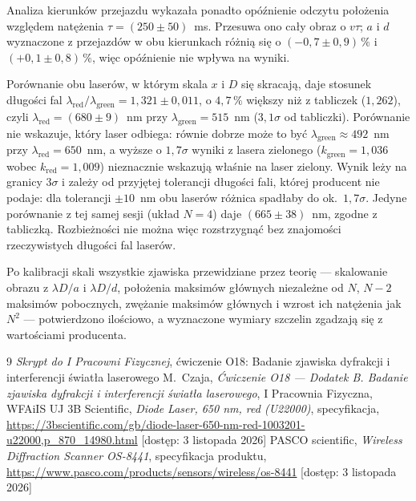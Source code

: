 \documentclass[12pt, a4paper]{article}
\begin{document}
Analiza kierunków przejazdu wykazała ponadto opóźnienie odczytu położenia względem natężenia
$\tau = (250 \pm 50)$~ms. Przesuwa ono cały obraz o $v\tau$; $a$ i $d$ wyznaczone z przejazdów
w obu kierunkach różnią się o $(-0{,}7 \pm 0{,}9)\,\%$ i $(+0{,}1 \pm 0{,}8)\,\%$, więc opóźnienie
nie wpływa na wyniki.

Porównanie obu laserów, w którym skala $x$ i $D$ się skracają, daje stosunek długości fal
$\lambda_\text{red}/\lambda_\text{green} = 1{,}321 \pm 0{,}011$, o $4{,}7\,\%$ większy niż z tabliczek
($1{,}262$), czyli $\lambda_\text{red} = (680 \pm 9)$~nm przy $\lambda_\text{green} = 515$~nm
($3{,}1\sigma$ od tabliczki). Porównanie nie wskazuje, który laser odbiega: równie dobrze może to być
$\lambda_\text{green} \approx 492$~nm przy $\lambda_\text{red} = 650$~nm, a wyższe o $1{,}7\sigma$ wyniki
z lasera zielonego ($k_\text{green} = 1{,}036$ wobec $k_\text{red} = 1{,}009$) nieznacznie wskazują
właśnie na laser zielony. Wynik leży na granicy $3\sigma$ i zależy od przyjętej tolerancji długości
fali, której producent nie podaje: dla tolerancji $\pm10$~nm obu laserów różnica spadłaby do
ok.\ $1{,}7\sigma$. Jedyne porównanie z tej samej sesji (układ $N = 4$) daje
$(665 \pm 38)$~nm, zgodne z tabliczką. Rozbieżności nie można więc rozstrzygnąć bez znajomości
rzeczywistych długości fal laserów.

Po kalibracji skali wszystkie zjawiska przewidziane przez teorię --- skalowanie obrazu
z $\lambda D/a$ i $\lambda D/d$, położenia maksimów głównych niezależne od $N$, $N - 2$ maksimów
pobocznych, zwężanie maksimów głównych i wzrost ich natężenia jak $N^2$ --- potwierdzono
ilościowo, a wyznaczone wymiary szczelin zgadzają się z wartościami producenta.

\begin{thebibliography}{9}
    \textit{Skrypt do I Pracowni Fizycznej}, ćwiczenie O18:
    Badanie zjawiska dyfrakcji i interferencji światła laserowego
    M.~Czaja, \textit{Ćwiczenie O18 --- Dodatek B. Badanie zjawiska dyfrakcji i interferencji
    światła laserowego}, I Pracownia Fizyczna, WFAiIS UJ
    3B Scientific, \textit{Diode Laser, 650 nm, red (U22000)}, specyfikacja,
    \url{https://3bscientific.com/gb/diode-laser-650-nm-red-1003201-u22000,p_870_14980.html}
    [dostęp: 3 listopada 2026]
    PASCO scientific, \textit{Wireless Diffraction Scanner OS-8441}, specyfikacja produktu,
    \url{https://www.pasco.com/products/sensors/wireless/os-8441}
    [dostęp: 3 listopada 2026]
\end{thebibliography}
\end{document}
